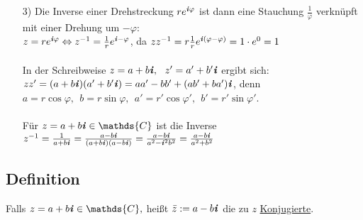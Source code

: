 \documentclass[12pt,titlepage, pdf]{article}
\newcommand{\C}{\mathds{C}}
\newcommand{\uline}[1]{\underline{#1}}
\newcommand*\colvec[1]{
	\global\colveccount#1
	\begin{pmatrix}
		\colvecnext
	}
\def\colvecnext#1{
		#1
		\global\advance\colveccount-1
		\ifnum\colveccount>0
		\\
		\expandafter\colvecnext
		\else
	\end{pmatrix}
	\fi
}
\renewcommand{\i}{\textbf{\textit{i}}}
\renewcommand{\>}{\rightarrow}
\renewcommand{\*}{\cdot}
\renewcommand{\phi}{\varphi}
\renewcommand{\vec}[1]{\colvec{#1}}
\begin{document}
\begin{itemize}
\begin{minipage}[c]{0.45\textwidth}
		      				      \end{minipage}
		      				\item[3)] Die Inverse einer Drehstreckung $re^{\i\phi}$ ist dann eine Stauchung $\frac{1}{\phi}$ verknüpft mit einer Drehung um $-\phi:$\\
		      				      $z = re^{\i\phi} \Leftrightarrow z^{-1} = \frac{1}{r} e^{\i-\phi}$, da $zz^{-1} = r \frac{1}{r} e^{\i(\phi - \phi)} = 1 \cdot e^0 = 1$\\
		      				      \\
		      				      In der Schreibweise $z= a+b\i,~~ z' = a' + b'\i$ ergibt sich:\\ $zz' = (a +b\i)(a' + b'\i) = aa' -bb' + (ab' + ba')\i$, denn \\$a = r \cos \phi,~~ b= r \sin\phi,~~ a' = r' \cos\phi',~~ b' = r' \sin\phi'$.\\ \\
		      				      Für $z = a +b\i \in \C$ ist die Inverse\\ $z^{-1} = \frac{1}{a+b\i} = \frac{a -b\i}{(a+ b\i)(a -b\i)}= \frac{a-b\i}{a^2 - \i^2 b^2} = \frac{a-b\i}{a^2 +b^2}$
		      			\end{itemize}
		      			\subsection{Definition}
		      			Falls $z = a+b\i \in \C,$ heißt $\bar{z} := a-b\i$ die zu $z$ \uline{Konjugierte}.
		      				
\end{document}
